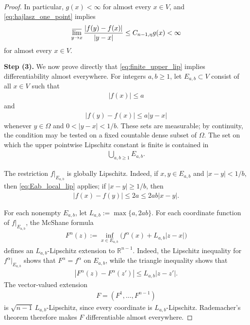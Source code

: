 \documentclass[10pt,a4paper]{amsart}
\newcommand{\R}{\mathbb R}
\begin{document}
\begin{proof}
In particular, \(g(x)<\infty\) for almost every \(x\in V\), and
\eqref{eq:hajlasz_one_point} implies
\begin{align}
\varlimsup_{y\to x}
\frac{|f(y)-f(x)|}{|y-x|}
\leq C_{n-1,\eta}g(x)<\infty
\label{eq:finite_upper_lip}
\end{align}
for almost every \(x\in V\).

\textbf{Step (3).} We now prove directly that \eqref{eq:finite_upper_lip} implies  
differentiability almost everywhere.  For integers \(a,b\geq1\), let
\(E_{a,b}\subset V\) consist of all \(x\in V\) such that
\begin{align}
|f(x)|\leq a\nonumber
\end{align}
and
\begin{align}
|f(y)-f(x)|\leq a|y-x|
\label{eq:Eab_local_lip}
\end{align}
whenever \(y\in\Omega\) and \(0<|y-x|<1/b\).  These sets are measurable;
by continuity, the condition may be tested on a fixed countable dense
subset of \(\Omega\).  The set on which the upper pointwise Lipschitz
constant is finite is contained in
\begin{align}
\bigcup_{a,b\geq1}E_{a,b}.\nonumber
\end{align}

The restriction \(f|_{E_{a,b}}\) is globally Lipschitz.  Indeed, if
\(x,y\in E_{a,b}\) and \(|x-y|<1/b\), then
\eqref{eq:Eab_local_lip} applies; if \(|x-y|\geq1/b\), then
\begin{align}
|f(x)-f(y)|\leq2a\leq2ab|x-y|.\nonumber
\end{align}

For each nonempty
\(E_{a,b}\), let \(L_{a,b}:=\max\{a,2ab\}\).  For each coordinate function of
\(f|_{E_{a,b}}\), the McShane formula
\begin{align}
F^\alpha(z)
:=
\inf_{x\in E_{a,b}}
\bigl(f^\alpha(x)+L_{a,b}|z-x|\bigr)\nonumber
\end{align}
defines an \(L_{a,b}\)-Lipschitz extension to \(\R^{n-1}\).  Indeed, the
Lipschitz inequality for \(f^\alpha|_{E_{a,b}}\) shows that
\(F^\alpha=f^\alpha\) on \(E_{a,b}\), while the triangle inequality
shows that
\begin{align}
|F^\alpha(z)-F^\alpha(z')|\leq L_{a,b}|z-z'|.\nonumber
\end{align}
The vector-valued extension
\begin{align}
F=(F^1,\dots,F^{n-1})\nonumber
\end{align}
is \(\sqrt{n-1}\,L_{a,b}\)-Lipschitz, since every coordinate is
\(L_{a,b}\)-Lipschitz.  Rademacher's theorem therefore makes \(F\)
  differentiable almost everywhere.


\end{proof}
\end{document}
